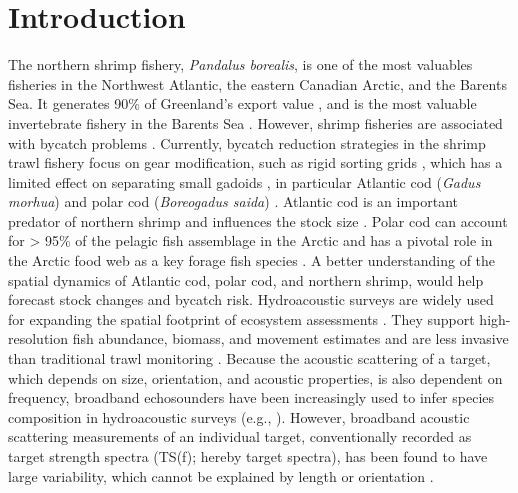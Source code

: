 \section{Introduction}
The northern shrimp fishery, \textit{Pandalus borealis}, is one of the most valuables fisheries in the Northwest Atlantic, the eastern Canadian Arctic, and the Barents Sea. It generates 90\% of Greenland's export value \citep{Garcia2007}, and is the most valuable invertebrate fishery in the Barents Sea \citep{Berenboim2000}. However, shrimp fisheries are associated with bycatch problems \citep{Howell1992, Grimaldo2005}. Currently, bycatch reduction strategies in the shrimp trawl fishery focus on gear modification, such as rigid sorting grids \citep{Hannah2007}, which has a limited effect on separating small gadoids \citep{Isaksen1992, Grimaldo2005}, in particular Atlantic cod (\textit{Gadus morhua}) and polar cod (\textit{Boreogadus saida}) \citep{Walkusz2020}. Atlantic cod is an important predator of northern shrimp and influences the stock size \citep{Garcia2007}. Polar cod can account for > 95\% of the pelagic fish assemblage in the Arctic and has a pivotal role in the Arctic food web as a key forage fish species \citep{Geoffroy2023}. A better understanding of the spatial dynamics of Atlantic cod, polar cod, and northern shrimp, would help forecast stock changes and bycatch risk. 
Hydroacoustic surveys are widely used for expanding the spatial footprint of ecosystem assessments \citep{Bassett2018}. They support high-resolution fish abundance, biomass, and movement estimates and are less invasive than traditional trawl monitoring \citep{Trenkel2019}. Because the acoustic scattering of a target, which depends on size, orientation, and acoustic properties, is also dependent on frequency, broadband echosounders have been increasingly used to infer species composition in hydroacoustic surveys (e.g., \citealt{Ross2013, Loranger2022}). However, broadband acoustic scattering measurements of an individual target, conventionally recorded as target strength spectra (TS(f); hereby target spectra), has been found to have large variability, which cannot be explained by length or orientation \citep{BrisenoAvena2015, Bassett2018, Dunning2023}. 
